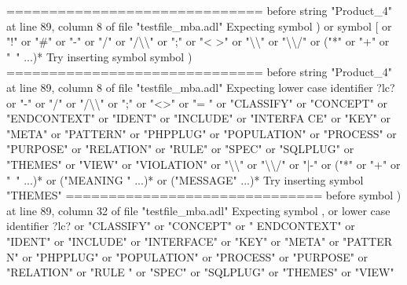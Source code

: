 {  ==============================\newline
  \newline
  before string "Product\_4" at line 89, column 8 of file "testfile\_mba.adl"\newline
  Expecting symbol ) or symbol [ or "!" or "\#" or "-" or "/" or "/\textbackslash{}\textbackslash{}" or ";" or "<\newline
  >" or "\textbackslash{}\textbackslash{}" or "\textbackslash{}\textbackslash{}/" or ("*" or "+" or "~" ...)*\newline
  Try inserting symbol symbol )\newline
  \newline
  ==============================\newline
  \newline
  before string "Product\_4" at line 89, column 8 of file "testfile\_mba.adl"\newline
  Expecting lower case identifier ?lc? or "-" or "/" or "/\textbackslash{}\textbackslash{}" or ";" or "<>" or "=\newline
  " or "CLASSIFY" or "CONCEPT" or "ENDCONTEXT" or "IDENT" or "INCLUDE" or "INTERFA\newline
  CE" or "KEY" or "META" or "PATTERN" or "PHPPLUG" or "POPULATION" or "PROCESS" or\newline
   "PURPOSE" or "RELATION" or "RULE" or "SPEC" or "SQLPLUG" or "THEMES" or "VIEW"\newline
  or "VIOLATION" or "\textbackslash{}\textbackslash{}" or "\textbackslash{}\textbackslash{}/" or "|-" or ("*" or "+" or "~" ...)* or ("MEANING\newline
  " ...)* or ("MESSAGE" ...)*\newline
  Try inserting symbol "THEMES"\newline
  \newline
  ==============================\newline
  \newline
  before symbol ) at line 89, column 32 of file "testfile\_mba.adl"\newline
  Expecting symbol , or lower case identifier ?lc? or "CLASSIFY" or "CONCEPT" or "\newline
  ENDCONTEXT" or "IDENT" or "INCLUDE" or "INTERFACE" or "KEY" or "META" or "PATTER\newline
  N" or "PHPPLUG" or "POPULATION" or "PROCESS" or "PURPOSE" or "RELATION" or "RULE\newline
  " or "SPEC" or "SQLPLUG" or "THEMES" or "VIEW"\newline
}
